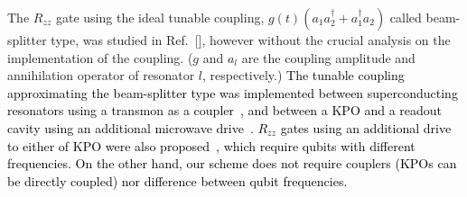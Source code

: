 \documentclass[%
 reprint,
 amsmath,amssymb,
 aps,
pra,
]{revtex4-2}
\begin{document}
The $R_{zz}$ gate using the ideal tunable coupling, $g(t)(a_1a_2^\dagger + a_1^\dagger a_2)$ called beam-splitter type, was studied in Ref.~[], however without the crucial analysis on the implementation of the coupling. 
($g$ and $a_l$ are the coupling amplitude and annihilation operator of resonator $l$, respectively.) 
\textcolor{black}{The tunable coupling approximating the beam-splitter type was implemented
between superconducting resonators using a transmon as a coupler~\cite{Gao2018}, and
between a KPO and a readout cavity using an additional microwave drive~\cite{Grimm2020}.}
\textcolor{black}{$R_{zz}$ gates using an additional drive to either of KPO were also proposed~\cite{Darmawan2021,Chono2022}, which require qubits with different frequencies. }
\textcolor{black}{On the other hand,
our scheme does not require couplers (KPOs can be directly coupled) nor difference between qubit  frequencies. 
}
\end{document}
